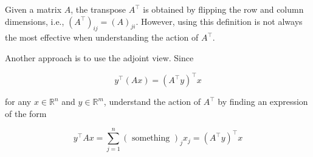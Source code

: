 \documentclass{beamer}
\begin{document}
\begin{frame}[allowframebreaks]

Given a matrix $A$, the transpose $A^{\top}$ is obtained by flipping the row and column dimensions, i.e., $\left(A^{\top}\right)_{i j}=(A)_{j i}$.
However, using this definition is not always the most effective when understanding the action of $A^{\top}$.

Another approach is to use the adjoint view. Since

$$
y^{\top}(A x)=\left(A^{\top} y\right)^{\top} x
$$

for any $x \in \mathbb{R}^{n}$ and $y \in \mathbb{R}^{m}$, understand the action of $A^{\top}$ by finding an expression of the form

$$
y^{\top} A x=\sum_{j=1}^{n}(\text { something })_{j} x_{j}=\left(A^{\top} y\right)^{\top} x
$$

\end{frame}
\end{document}
